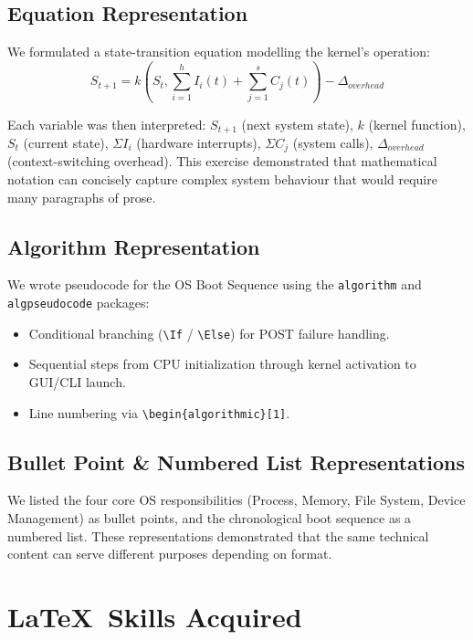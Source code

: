 \documentclass[11pt, a4paper]{article}
\begin{document}
\subsection{Equation Representation}
We formulated a state-transition equation modelling the kernel's operation:
\begin{equation*}
    S_{t+1} = k \left( S_t, \sum_{i=1}^{h} I_i(t) + \sum_{j=1}^{s} C_j(t) \right) - \Delta_{overhead}
\end{equation*}

Each variable was then interpreted: $S_{t+1}$ (next system state), $k$ (kernel function), $S_t$ (current state), $\Sigma I_i$ (hardware interrupts), $\Sigma C_j$ (system calls), $\Delta_{overhead}$ (context-switching overhead). This exercise demonstrated that mathematical notation can concisely capture complex system behaviour that would require many paragraphs of prose.

\subsection{Algorithm Representation}
We wrote pseudocode for the OS Boot Sequence using the \texttt{algorithm} and \texttt{algpseudocode} packages:
\begin{itemize}[nosep]
    \item Conditional branching (\texttt{\textbackslash If} / \texttt{\textbackslash Else}) for POST failure handling.
    \item Sequential steps from CPU initialization through kernel activation to GUI/CLI launch.
    \item Line numbering via \texttt{\textbackslash begin\{algorithmic\}[1]}.
\end{itemize}

\subsection{Bullet Point \& Numbered List Representations}
We listed the four core OS responsibilities (Process, Memory, File System, Device Management) as bullet points, and the chronological boot sequence as a numbered list. These representations demonstrated that the same technical content can serve different purposes depending on format.

\section{\LaTeX\ Skills Acquired}
\end{document}
